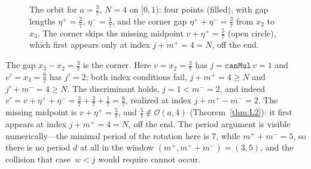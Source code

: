 \documentclass[11pt,reqno]{amsart}
\theoremstyle{plain}
\theoremstyle{definition}
\theoremstyle{remark}
\newcommand{\etap}{\eta^{+}}
\newcommand{\etam}{\eta^{-}}
\newcommand{\mpl}{m^{+}}
\newcommand{\mmi}{m^{-}}
\newcommand{\orb}{\mathcal{O}}
\newcommand{\code}[1]{\texttt{#1}}
\begin{document}
\begin{figure}[ht]
\centering
{}
\caption{The orbit for $a=\tfrac37$, $N=4$ on $[0,1)$: four points (filled), with
gap lengths $\etap=\tfrac27$, $\etam=\tfrac17$, and the corner gap
$\etap+\etam=\tfrac37$ from $x_2$ to $x_3$.  The corner skips the missing midpoint
$v+\etap=\tfrac57$ (open circle), which first appears only at index
$j+\mpl=4=N$, off the end.}
\label{fig:example}
\end{figure}

The gap $x_3-x_2=\tfrac37$ is the corner.  Here $v=x_2=\tfrac37$ has
$j=\code{canMul}\,v=1$ and $v'=x_3=\tfrac67$ has $j'=2$; both index conditions
fail, $j+\mpl=4\ge N$ and $j'+\mmi=4\ge N$.  The discriminant holds,
$j=1<\mmi=2$, and indeed $v'=v+\etap+\etam=\tfrac37+\tfrac27+\tfrac17=\tfrac67$,
realized at index $j+\mpl-\mmi=2$.  The missing midpoint is
$v+\etap=\tfrac57$, and $\tfrac57\notin\orb(a,4)$ (Theorem~\ref{thm:L2}): it
first appears at index $j+\mpl=4=N$, off the end.  The period argument is
visible numerically---the minimal period of the rotation here is $7$, while
$\mpl+\mmi=5$, so
there is no period $d$ at all in the window $(\mpl,\mpl+\mmi)=(3,5)$, and the
collision that case~$w<j$ would require cannot occur.

\end{document}
